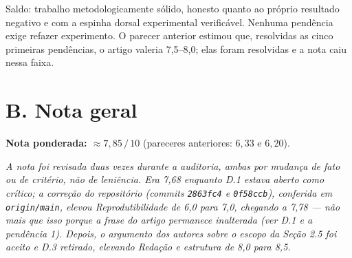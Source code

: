 \documentclass[11pt,a4paper]{article}
\begin{document}
Saldo: trabalho metodologicamente sólido, honesto quanto ao próprio resultado negativo e com a
espinha dorsal experimental verificável. Nenhuma pendência exige refazer experimento. O parecer
anterior estimou que, resolvidas as cinco primeiras pendências, o artigo valeria 7,5--8,0; elas foram
resolvidas e a nota caiu nessa faixa.

\section*{B. Nota geral}

\textbf{Nota ponderada: $\approx 7{,}85\,/\,10$} \quad (pareceres anteriores: $6{,}33$ e $6{,}20$).

\textit{A nota foi revisada duas vezes durante a auditoria, ambas por mudança de fato ou de critério,
não de leniência. Era 7,68 enquanto D.1 estava aberto como crítico; a correção do repositório
(commits \texttt{2863fc4} e \texttt{0f58ccb}), conferida em \texttt{origin/main}, elevou
Reprodutibilidade de 6,0 para 7,0, chegando a 7,78 --- não mais que isso porque a frase do artigo
permanece inalterada (ver D.1 e a pendência 1). Depois, o argumento dos autores sobre o escopo da
Seção 2.5 foi aceito e D.3 retirado, elevando Redação e estrutura de 8,0 para 8,5.}
\end{document}
